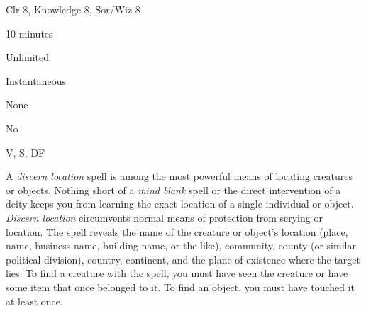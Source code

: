 
\begin{description*}
\item[Level:] Clr 8, Knowledge 8, Sor/Wiz 8
\item[Casting Time:] 10 minutes
\item[Range:] Unlimited
\item[Duration:] Instantaneous
\item[Saving Throw:] None
\item[Spell Resistance:] No
\item[Components:] V, S, DF
\end{description*}

A \textit{discern location} spell is among the most powerful means of locating
creatures or objects. Nothing short of a \textit{mind blank} spell or the direct
intervention of a deity keeps you from learning the exact location of a single
individual or object. \textit{Discern location} circumvents normal means of protection
from scrying or location. The spell reveals the name of the creature or object's
location (place, name, business name, building name, or the like), community, county
(or similar political division), country, continent, and the plane of existence
where the target lies.
To find a creature with the spell, you must have seen the creature or have some
item that once belonged to it. To find an object, you must have touched it at least
once.